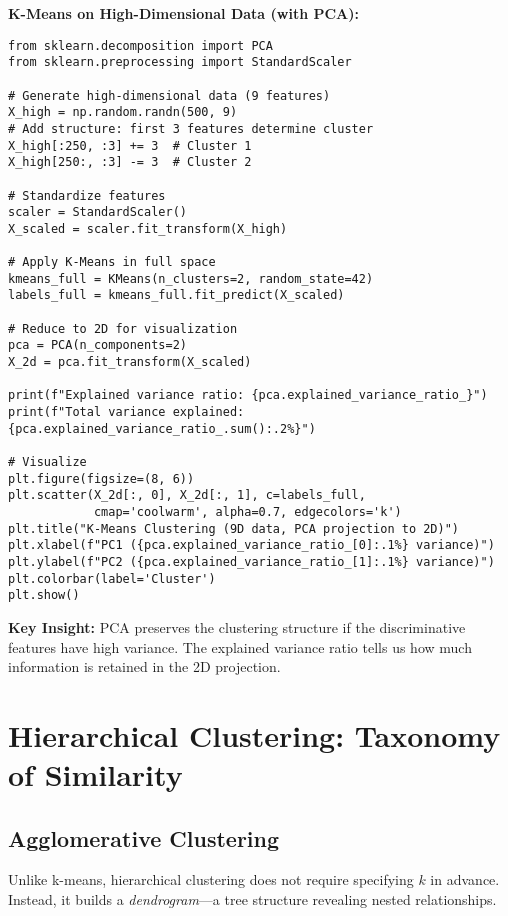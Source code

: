 \begin{codebox}
\textbf{K-Means on High-Dimensional Data (with PCA):}

\begin{lstlisting}
from sklearn.decomposition import PCA
from sklearn.preprocessing import StandardScaler

# Generate high-dimensional data (9 features)
X_high = np.random.randn(500, 9)
# Add structure: first 3 features determine cluster
X_high[:250, :3] += 3  # Cluster 1
X_high[250:, :3] -= 3  # Cluster 2

# Standardize features
scaler = StandardScaler()
X_scaled = scaler.fit_transform(X_high)

# Apply K-Means in full space
kmeans_full = KMeans(n_clusters=2, random_state=42)
labels_full = kmeans_full.fit_predict(X_scaled)

# Reduce to 2D for visualization
pca = PCA(n_components=2)
X_2d = pca.fit_transform(X_scaled)

print(f"Explained variance ratio: {pca.explained_variance_ratio_}")
print(f"Total variance explained: {pca.explained_variance_ratio_.sum():.2%}")

# Visualize
plt.figure(figsize=(8, 6))
plt.scatter(X_2d[:, 0], X_2d[:, 1], c=labels_full, 
            cmap='coolwarm', alpha=0.7, edgecolors='k')
plt.title("K-Means Clustering (9D data, PCA projection to 2D)")
plt.xlabel(f"PC1 ({pca.explained_variance_ratio_[0]:.1%} variance)")
plt.ylabel(f"PC2 ({pca.explained_variance_ratio_[1]:.1%} variance)")
plt.colorbar(label='Cluster')
plt.show()
\end{lstlisting}

\textbf{Key Insight:} PCA preserves the clustering structure if the discriminative features have high variance. The explained variance ratio tells us how much information is retained in the 2D projection.
\end{codebox}

\section{Hierarchical Clustering: Taxonomy of Similarity}

\subsection{Agglomerative Clustering}

Unlike k-means, hierarchical clustering does not require specifying $k$ in advance. Instead, it builds a \textit{dendrogram}---a tree structure revealing nested relationships.

